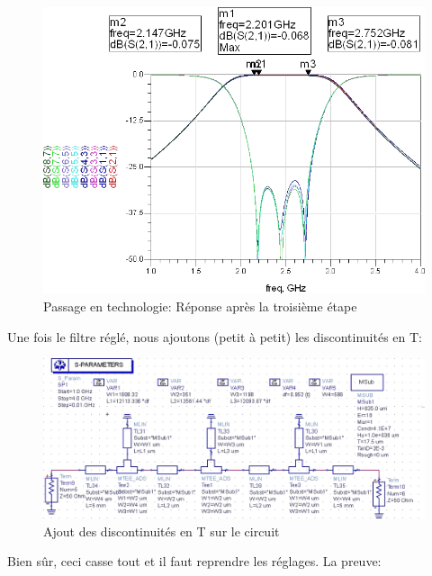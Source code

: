\documentclass[10pt]{article}
\begin{document}
\begin{figure}
    \begin{center}
        \includegraphics[width=14cm]{p21_Simu3}
    \end{center}
    \caption{Passage en technologie: Réponse après la troisième étape}
\end{figure}


Une fois le filtre réglé, nous ajoutons (petit à petit) les discontinuités en T:

\begin{figure}
    \begin{center}
        \includegraphics[width=15cm]{last_circuit}
    \end{center}
    \caption{Ajout des discontinuités en T sur le circuit}
\end{figure}

Bien sûr, ceci casse tout et il faut reprendre les réglages. La preuve:
\end{document}

